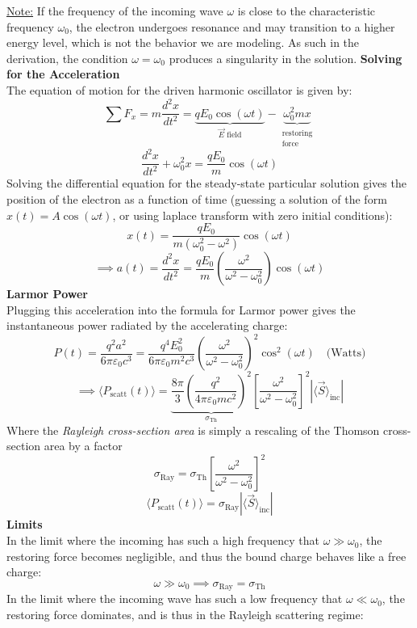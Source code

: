\documentclass[12pt]{article}
\begin{document}
\noindent\underline{Note:} If the frequency of the incoming wave $\omega$ is close to the characteristic frequency $\omega_0$, the electron undergoes resonance and may transition to a higher energy level, which is not the behavior we are modeling. As such in the derivation, the condition $\omega = \omega_0$ produces a singularity in the solution.
\newpage\noindent
\textbf{Solving for the Acceleration}\\
The equation of motion for the driven harmonic oscillator is given by:
\[\sum F_x = m \frac{d^2 x}{dt^2} = \underbrace{q E_0 \cos(\omega t)}_{\text{$\vec{E}$ field}} - \underbrace{\omega_0^2mx}_{\substack{{\text{restoring}}\\\text{force}}}\]
\[\frac{d^2x}{dt^2}+\omega_0^2x = \frac{q E_0}{m}\cos(\omega t)\]
Solving the differential equation for the steady-state particular solution gives the position of the electron as a function of time (guessing a solution of the form $x(t) = A\cos(\omega t)$, or using laplace transform with zero initial conditions):
\[x(t) = \frac{q E_0}{m(\omega_0^2 - \omega^2)}\cos(\omega t)\]
\[\implies a(t) = \frac{d^2x}{dt^2} = \frac{qE_0}{m}\left(\frac{\omega^2}{\omega^2-\omega_0^2}\right)\cos(\omega t)\]
\textbf{Larmor Power}\\
Plugging this acceleration into the formula for Larmor power gives the instantaneous power radiated by the accelerating charge:
\[P(t) = \frac{q^2a^2}{6\pi\varepsilon_0c^3} = 
\frac{q^4E_0^2}{6\pi\varepsilon_0m^2c^3}\left(\frac{\omega^2}{\omega^2-\omega_0^2}\right)^2\cos^2(\omega t) \quad\text{(Watts)}\]
\[\implies
\langle P_{\text{scatt}}(t) \rangle
=
\underbrace{
\frac{8\pi}{3}
\left(
\frac{q^2}{4\pi \varepsilon_0 m c^2}
\right)^2}_{\sigma_{\text{Th}}}
\left[
\frac{\omega^2}{\omega^2 - \omega_0^2}
\right]^2
|\langle \vec{S} \rangle_{\text{inc}}|
\]
Where the \textit{Rayleigh cross-section area} is simply a rescaling of the Thomson cross-section area by a factor
\[
\sigma_{\text{Ray}}
=
\sigma_{\text{Th}}
\left[
\frac{\omega^2}{\omega^2 - \omega_0^2}
\right]^2
\]
\[\boxed{\langle P_{\text{scatt}}(t) \rangle = \sigma_{\text{Ray}} |\langle \vec{S} \rangle_{\text{inc}}|}\]
\textbf{Limits}\\
In the limit where the incoming has such a high frequency that $\omega \gg \omega_0$, the restoring force becomes negligible, and thus the bound charge behaves like a free charge:
\[\omega \gg \omega_0 \implies \sigma_\text{Ray} = \sigma_\text{Th}\]
In the limit where the incoming wave has such a low frequency that $\omega \ll \omega_0$, the restoring force dominates, and is thus in the Rayleigh scattering regime:
\end{document}
